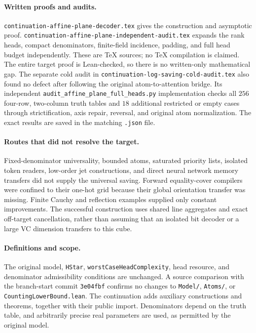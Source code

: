 \documentclass[11pt]{article}
\begin{document}
\paragraph{Written proofs and audits.}
\texttt{continuation-affine-plane-decoder.tex} gives the construction and
asymptotic proof. \texttt{continuation-affine-plane-independent-audit.tex}
expands the rank heads, compact denominators, finite-field incidence,
padding, and full head budget independently. These are TeX sources;
no TeX compilation is claimed. The entire target proof is Lean-checked,
so there is no written-only mathematical gap.
The separate cold audit in \texttt{continuation-log-saving-cold-audit.tex}
also found no defect after following the original atom-to-attention bridge.
Its independent \texttt{audit\_affine\_plane\_full\_heads.py} implementation
checks all $256$ four-row, two-column truth tables and $18$ additional
restricted or empty cases through strictification, axis repair, reversal,
and original atom normalization. The exact results are saved in the
matching \texttt{.json} file.

\paragraph{Routes that did not resolve the target.}
Fixed-denominator universality, bounded atoms, saturated priority lists,
isolated token readers, low-order jet constructions, and direct neural
network memory transfers did not supply the universal saving.
Forward equality-cover compilers were confined to their one-hot grid
because their global orientation transfer was missing.
Finite Cauchy and reflection examples supplied only constant improvements.
The successful construction uses shared line aggregates and exact
off-target cancellation, rather than assuming that an isolated bit decoder
or a large VC dimension transfers to this cube.

\paragraph{Definitions and scope.}
The original model, \texttt{HStar}, \texttt{worstCaseHeadComplexity},
head resource, and denominator admissibility conditions are unchanged.
A source comparison with the branch-start commit \texttt{3e04fbf} confirms
no changes to \texttt{Model/}, \texttt{Atoms/}, or
\texttt{CountingLowerBound.lean}. The continuation adds auxiliary
constructions and theorems, together with their public import.
Denominators depend on the truth table, and arbitrarily precise real
parameters are used, as permitted by the original model.
\end{document}
